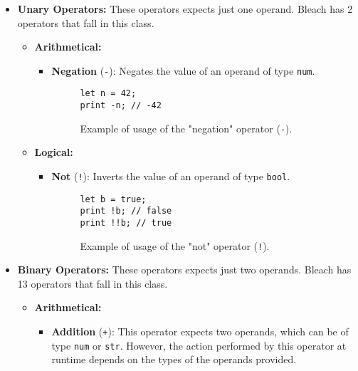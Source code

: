 \begin{itemize}
    \item \textbf{Unary Operators:} These operators expects just one operand. Bleach has 2 operators that fall in this class.
        \begin{itemize}
            \item \textbf{Arithmetical:}
                \begin{itemize}
                    \item \textbf{Negation} (\texttt{-}): Negates the value of an operand of type \texttt{num}.
                    \begin{figure}[H]
                        \centering
                        \begin{lstlisting}
let n = 42;
print -n; // -42
                        \end{lstlisting}
                        \caption{Example of usage of the "negation" operator (\texttt{-}).}
                    \end{figure}
                \end{itemize}
                \newpage
            \item \textbf{Logical:}
                \begin{itemize}
                    \item \textbf{Not} (\texttt{!}): Inverts the value of an operand of type \texttt{bool}.
                    \begin{figure}[H]
                        \centering
                        \begin{lstlisting}
let b = true;
print !b; // false
print !!b; // true
                        \end{lstlisting}
                        \caption{Example of usage of the "not" operator (\texttt{!}).}
                    \end{figure}                    
                \end{itemize}
        \end{itemize}
    \item \textbf{Binary Operators:} These operators expects just two operands. Bleach has 13 operators that fall in this class.
        \begin{itemize}
            \item \textbf{Arithmetical:}
                \begin{itemize}
                    \item \textbf{Addition} (\texttt{+}): This operator expects two operands, which can be of type \texttt{num} or \texttt{str}. However, the action performed by this operator at runtime depends on the types of the operands provided.


\end{itemize}
\end{itemize}
\end{itemize}
